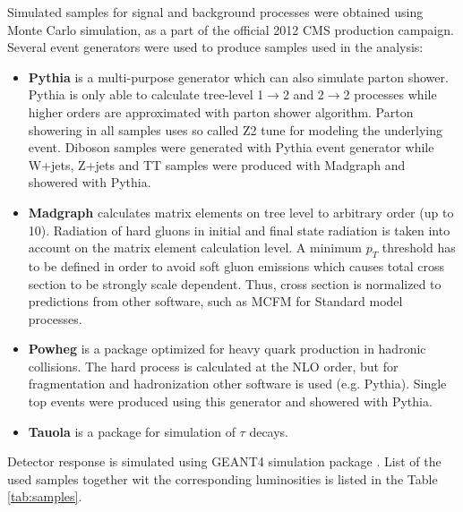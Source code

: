 \par Simulated samples for signal and background processes were obtained using Monte Carlo simulation, as a part of the official 2012 CMS production campaign. Several event generators were used to produce samples used in the analysis:
\begin{itemize}
\item \textbf{Pythia} \cite{Sjostrand:2006za,Sjostrand:2007gs} is a multi-purpose generator which can also simulate parton shower. Pythia is only able to calculate tree-level 1$\rightarrow$2 and 2$\rightarrow$2 processes while higher orders are approximated with parton shower algorithm. Parton showering in all samples uses so called Z2 tune for modeling the underlying event\cite{Field:2010bc,Chatrchyan:2013ala}. Diboson samples were generated with Pythia event generator while W+jets, Z+jets and TT samples were produced with Madgraph and showered with Pythia.  
\item \textbf{Madgraph} \cite{Alwall:2011uj} calculates matrix elements on tree level to arbitrary order (up to 10). Radiation of hard gluons in initial and final state radiation is taken into account on the matrix element calculation level. A minimum $p_T$ threshold has to be defined in order to avoid soft gluon emissions which causes total cross section to be strongly scale dependent. Thus, cross section is normalized to predictions from other software, such as MCFM\cite{Campbell:2010ff} for Standard model processes.   
\item \textbf{Powheg} \cite{Oleari:2010nx} is a package optimized for heavy quark production in hadronic collisions. The hard process is calculated at the NLO order, but for fragmentation and hadronization other software is used (e.g. Pythia). Single top events were produced using this generator and showered with Pythia. 
\item \textbf{Tauola} \cite{Jadach:1993hs} is a package for simulation of $\tau$ decays.
\end{itemize}
        
Detector response is simulated using GEANT4 simulation package \cite{Agostinelli:2002hh}. List of the used samples together wit the corresponding luminosities is listed in the Table \ref{tab:samples}.

